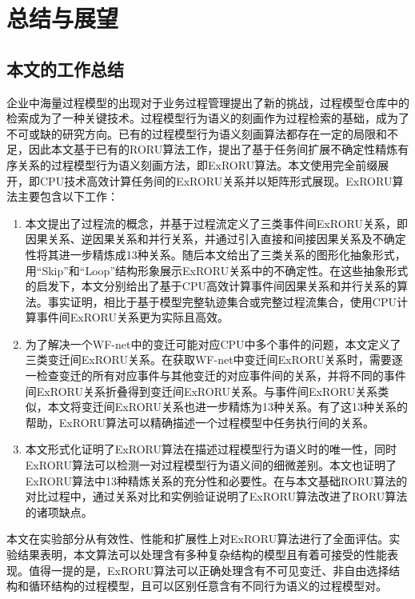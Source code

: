 
\chapter{总结与展望}\label{cha:conclusion}

\section{本文的工作总结}\label{sec:conclusion}
企业中海量过程模型的出现对于业务过程管理提出了新的挑战，过程模型仓库中的检索成为了一种关键技术。过程模型行为语义的刻画作为过程检索的基础，成为了不可或缺的研究方向。已有的过程模型行为语义刻画算法都存在一定的局限和不足，因此本文基于已有的RORU算法工作，提出了基于任务间扩展不确定性精炼有序关系的过程模型行为语义刻画方法，即ExRORU算法。本文使用完全前缀展开，即CPU技术高效计算任务间的ExRORU关系并以矩阵形式展现。ExRORU算法主要包含以下工作：
\begin{enumerate}[1.]
  \item 本文提出了过程流的概念，并基于过程流定义了三类事件间ExRORU关系，即因果关系、逆因果关系和并行关系，并通过引入直接和间接因果关系及不确定性将其进一步精炼成13种关系。随后本文给出了三类关系的图形化抽象形式，用“Skip”和“Loop”结构形象展示ExRORU关系中的不确定性。在这些抽象形式的启发下，本文分别给出了基于CPU高效计算事件间因果关系和并行关系的算法。事实证明，相比于基于模型完整轨迹集合或完整过程流集合，使用CPU计算事件间ExRORU关系更为实际且高效。
  \item 为了解决一个WF-net中的变迁可能对应CPU中多个事件的问题，本文定义了三类变迁间ExRORU关系。在获取WF-net中变迁间ExRORU关系时，需要逐一检查变迁的所有对应事件与其他变迁的对应事件间的关系，并将不同的事件间ExRORU关系折叠得到变迁间ExRORU关系。与事件间ExRORU关系类似，本文将变迁间ExRORU关系也进一步精炼为13种关系。有了这13种关系的帮助，ExRORU算法可以精确描述一个过程模型中任务执行间的关系。
  \item 本文形式化证明了ExRORU算法在描述过程模型行为语义时的唯一性，同时ExRORU算法可以检测一对过程模型行为语义间的细微差别。本文也证明了ExRORU算法中13种精炼关系的充分性和必要性。在与本文基础RORU算法的对比过程中，通过关系对比和实例验证说明了ExRORU算法改进了RORU算法的诸项缺点。
\end{enumerate}

本文在实验部分从有效性、性能和扩展性上对ExRORU算法进行了全面评估。实验结果表明，本文算法可以处理含有多种复杂结构的模型且有着可接受的性能表现。值得一提的是，ExRORU算法可以正确处理含有不可见变迁、非自由选择结构和循环结构的过程模型，且可以区别任意含有不同行为语义的过程模型对。

